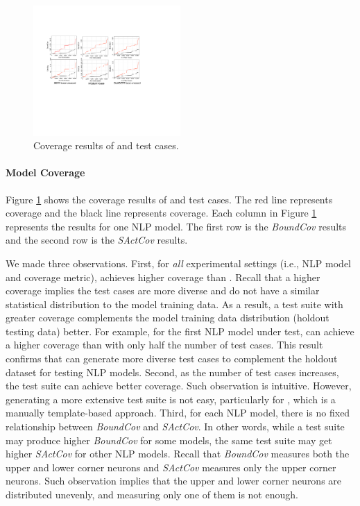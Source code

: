 
\begin{figure}
    \centering
    \includegraphics[width=0.5\textwidth]{figs/nlp_coverage.pdf}
    \vspace{-6mm}
    \caption{Coverage results of \tool and \Cklst test cases.}
    \label{fig:coverage}
\end{figure}

\paragraph*{Model Coverage} Figure \ref{fig:coverage} shows the coverage results of \tool and \Cklst test cases. The red line represents \tool coverage and the black line represents \Cklst coverage. Each column in Figure \ref{fig:coverage} represents the results for one NLP model. The first row is the \textit{BoundCov} results and the second row is the \textit{SActCov} results.

We made three observations.
First, for \emph{all} experimental settings (i.e., NLP model and coverage metric), \tool achieves higher coverage than \Cklst. Recall that a higher coverage implies the test cases are more diverse and do not have a similar statistical distribution to the model training data. As a result, a test suite with greater coverage complements the model training data distribution (\ie holdout testing data) better.
For example, for the first NLP model under test, \tool can achieve a higher coverage than \Cklst with only half the number of test cases.
This result confirms that \tool can generate more diverse test cases to complement the holdout dataset for testing NLP models.
Second, as the number of test cases increases, the test suite can achieve better coverage. Such observation is intuitive. However, generating a more extensive test suite is not easy, particularly  for \Cklst, which is a manually template-based approach.
Third, for each NLP model, there is no fixed relationship between \textit{BoundCov} and \textit{SActCov}. In other words, while a test suite may produce higher \textit{BoundCov} for some models, the same test suite may get higher \textit{SActCov} for other NLP models.
Recall that \textit{BoundCov} measures both the upper and lower corner neurons and \textit{SActCov} measures only the upper corner neurons. 
Such observation implies that the upper and lower corner neurons are distributed unevenly, and measuring only one of them is not enough.
